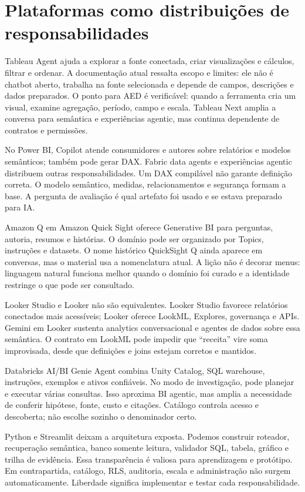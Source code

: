 \section{Plataformas como distribuições de responsabilidades}

Tableau Agent ajuda a explorar a fonte conectada, criar visualizações e cálculos, filtrar e ordenar. A documentação atual ressalta escopo e limites: ele não é chatbot aberto, trabalha na fonte selecionada e depende de campos, descrições e dados preparados. O ponto para AED é verificável: quando a ferramenta cria um visual, examine agregação, período, campo e escala. Tableau Next amplia a conversa para semântica e experiências agentic, mas continua dependente de contratos e permissões.

No Power BI, Copilot atende consumidores e autores sobre relatórios e modelos semânticos; também pode gerar DAX. Fabric data agents e experiências agentic distribuem outras responsabilidades. Um DAX compilável não garante definição correta. O modelo semântico, medidas, relacionamentos e segurança formam a base. A pergunta de avaliação é qual artefato foi usado e se estava preparado para IA.

Amazon Q em Amazon Quick Sight oferece Generative BI para perguntas, autoria, resumos e histórias. O domínio pode ser organizado por Topics, instruções e datasets. O nome histórico QuickSight Q ainda aparece em conversas, mas o material usa a nomenclatura atual. A lição não é decorar menus: linguagem natural funciona melhor quando o domínio foi curado e a identidade restringe o que pode ser consultado.

Looker Studio e Looker não são equivalentes. Looker Studio favorece relatórios conectados mais acessíveis; Looker oferece LookML, Explores, governança e APIs. Gemini em Looker sustenta analytics conversacional e agentes de dados sobre essa semântica. O contrato em LookML pode impedir que ``receita'' vire soma improvisada, desde que definições e joins estejam corretos e mantidos.

Databricks AI/BI Genie Agent combina Unity Catalog, SQL warehouse, instruções, exemplos e ativos confiáveis. No modo de investigação, pode planejar e executar várias consultas. Isso aproxima BI agentic, mas amplia a necessidade de conferir hipótese, fonte, custo e citações. Catálogo controla acesso e descoberta; não escolhe sozinho o denominador certo.

Python e Streamlit deixam a arquitetura exposta. Podemos construir roteador, recuperação semântica, banco somente leitura, validador SQL, tabela, gráfico e trilha de evidência. Essa transparência é valiosa para aprendizagem e protótipo. Em contrapartida, catálogo, RLS, auditoria, escala e administração não surgem automaticamente. Liberdade significa implementar e testar cada responsabilidade.

